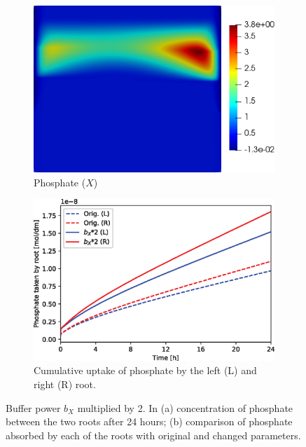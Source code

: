 \documentclass[11pt]{article}
\numberwithin{equation}{section}
\begin{document}
\begin{figure}[!htb]
\centering
\begin{subfigure}[t]{0.35\textwidth}
    \includegraphics[width=\textwidth]{Figures/X_bXtimes2.png}
    \caption{Phosphate ($X$)}
    \label{fig:numexp_bxup1}
\end{subfigure}
\hspace{1cm}
\begin{subfigure}[t]{0.4\textwidth}
    \includegraphics[width=\textwidth]{Figures/bxtimes2.eps}
    \caption{Cumulative uptake of phosphate by the left (L) and right (R) root.}
    \label{fig:numexp_bxup2}
\end{subfigure}
\caption{Buffer power $b_X$ multiplied by 2. In (a) concentration of phosphate between the two roots after 24 hours; (b) comparison of phosphate absorbed by each of the roots with original and changed parameters.}
\label{fig:numexp_bxup}
\end{figure}
\end{document}
